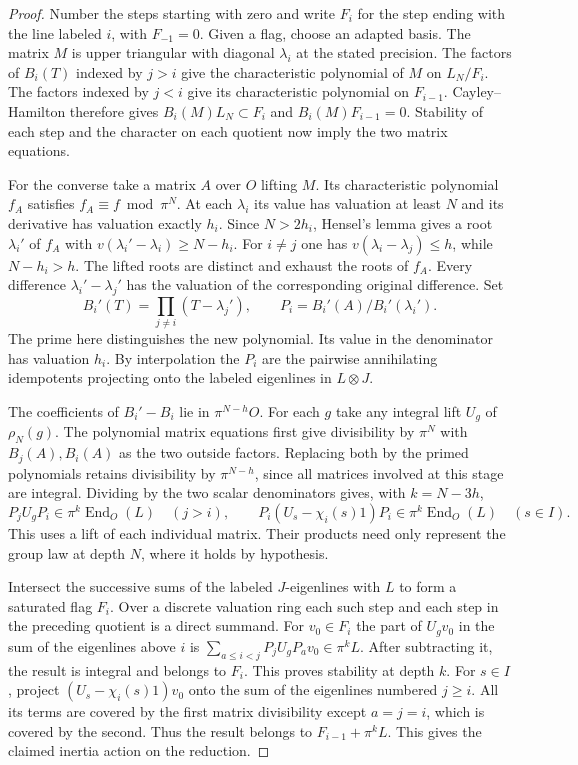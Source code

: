 \documentclass[a4paper,11pt]{article}
\theoremstyle{definition}
\theoremstyle{remark}
\numberwithin{equation}{section}
\begin{document}
\begin{proof}
Number the steps starting with zero and write \(F_i\) for
the step ending with the line labeled \(i\), with \(F_{-1}=0\).
Given a flag, choose an adapted basis. The matrix \(M\) is
upper triangular with diagonal \(\lambda_i\) at the stated
precision. The factors of \(B_i(T)\) indexed by \(j>i\)
give the characteristic polynomial of \(M\) on \(L_N/F_i\).
The factors indexed by \(j<i\) give its characteristic
polynomial on \(F_{i-1}\). Cayley--Hamilton therefore gives
\(B_i(M)L_N\subset F_i\) and \(B_i(M)F_{i-1}=0\).
Stability of each step and the character on each quotient
now imply the two matrix equations.

For the converse take a matrix \(A\) over \(O\) lifting \(M\).
Its characteristic polynomial \(f_A\) satisfies
\(f_A\equiv f\bmod\pi^N\). At each \(\lambda_i\) its value
has valuation at least \(N\) and its derivative has valuation
exactly \(h_i\). Since \(N>2h_i\), Hensel's lemma gives a
root \(\lambda_i'\) of \(f_A\) with
\(v(\lambda_i'-\lambda_i)\ge N-h_i\). For \(i\ne j\) one
has \(v(\lambda_i-\lambda_j)\le h\), while \(N-h_i>h\).
The lifted roots are distinct and exhaust the roots of \(f_A\).
Every difference \(\lambda_i'-\lambda_j'\) has the valuation
of the corresponding original difference. Set
\[
       B_i'(T)=\prod_{j\ne i}(T-\lambda_j'),\qquad
       P_i=B_i'(A)/B_i'(\lambda_i').
\]
The prime here distinguishes the new polynomial. Its value in
the denominator has valuation \(h_i\). By interpolation the
\(P_i\) are the pairwise annihilating idempotents projecting
onto the labeled eigenlines in \(L\otimes J\).

The coefficients of \(B_i'-B_i\) lie in \(\pi^{N-h}O\).
For each \(g\) take any integral lift \(U_g\) of \(\rho_N(g)\).
The polynomial matrix equations first give divisibility by
\(\pi^N\) with \(B_j(A),B_i(A)\) as the two outside factors.
Replacing both by the primed polynomials retains divisibility
by \(\pi^{N-h}\), since all matrices involved at this stage
are integral. Dividing by the two scalar denominators gives,
with \(k=N-3h\),
\[
  P_j U_g P_i\in\pi^k\operatorname{End}_O(L)\quad(j>i),
   \qquad
  P_i(U_s-\chi_i(s)1)P_i\in\pi^k\operatorname{End}_O(L)
                                  \quad(s\in I).
\]
This uses a lift of each individual matrix. Their products
need only represent the group law at depth \(N\), where it
holds by hypothesis.

Intersect the successive sums of the labeled \(J\)-eigenlines
with \(L\) to form a saturated flag \(F_i\). Over a discrete
valuation ring each such step and each step in the preceding
quotient is a direct summand. For \(v_0\in F_i\) the part of
\(U_g v_0\) in the sum of the eigenlines above \(i\) is
\(\sum_{a\le i<j}P_j U_gP_a v_0\in\pi^kL\). After subtracting
it, the result is integral and belongs to \(F_i\). This
proves stability at depth \(k\). For \(s\in I\), project
\((U_s-\chi_i(s)1)v_0\) onto the sum of the eigenlines
numbered \(j\ge i\). All its terms are covered by the first
matrix divisibility except \(a=j=i\), which is covered by
the second. Thus the result belongs to \(F_{i-1}+\pi^kL\).
This gives the claimed inertia action on the reduction.


\end{proof}
\end{document}
